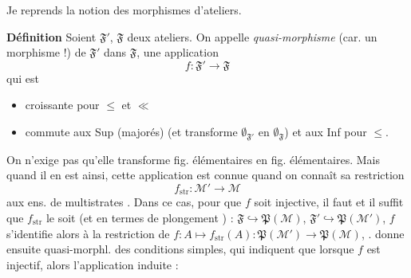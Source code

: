 \documentclass[11pt,a4paper]{article}
\begin{document}


Je reprends la notion des  morphismes d'ateliers.

\textbf{Définition} Soient $\mathfrak{F}'$, $\mathfrak{F}$ deux ateliers. On appelle \struck{\ill{}} \emph{quasi-morphisme}  (car. \ill{} \ill{} un morphisme !) de $\mathfrak{F}'$ dans $\mathfrak{F}$, une application
\[
  f : \mathfrak{F}' \longrightarrow \mathfrak{F}
\]
qui est
\begin{itemize}
  \item[a)] croissante pour $\leq$ et $\ll$
  \item[b)] commute aux Sup  (majorés) (et  transforme $\emptyset_{\mathfrak{F}'}$ en $\emptyset_{\mathfrak{F}}$) et aux Inf pour $\leq$.
\end{itemize}


On n'exige pas qu'elle transforme fig. élémentaires en fig. élémentaires. Mais quand il en est ainsi, cette application est connue quand on connaît sa restriction 
\[
  f_{\mathrm{str}} : \mathcal{M}' \longrightarrow \mathcal{M}
\]
aux ens. de multistrates . Dans ce cas, pour que $f$ soit injective, il faut et il suffit que $f_{\mathrm{str}}$ le soit (et en termes de plongement \ill{}) \ill{} \ill{} : $\mathfrak{F} \hookrightarrow \mathfrak{P}(\mathcal{M})$, $\mathfrak{F}' \hookrightarrow \mathfrak{P}(\mathcal{M}')$, $f$ s'identifie alors à la restriction \struck{\ill{}} de $f : A \mapsto f_{\mathrm{str}}(A) : \mathfrak{P}(\mathcal{M}') \to \mathfrak{P}(\mathcal{M})$,  . \ill{} \ill{} \ill{} donne ensuite \ill{} \ill{} \ill{} quasi-morphl. des conditions simples, qui indiquent que lorsque $f$ est injectif, alors l'application induite :

\end{document}
